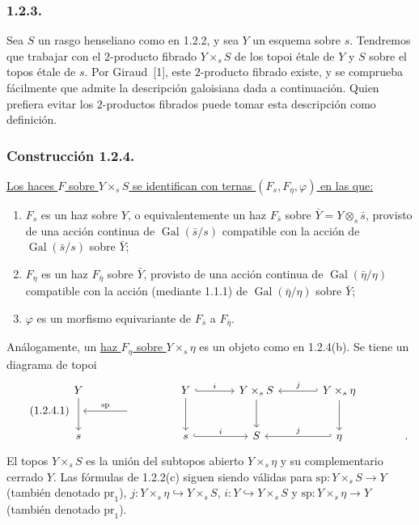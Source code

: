 \subsubsection*{1.2.3.}
Sea $S$ un rasgo henseliano como en 1.2.2, y sea $Y$ un esquema sobre $s$.
Tendremos que trabajar con el $2$-producto fibrado $Y\times_sS$ de los topoi
étale de $Y$ y $S$ sobre el topos étale de $s$. Por Giraud~[1], este
$2$-producto fibrado existe, y se comprueba fácilmente que admite la
descripción galoisiana dada a continuación. Quien prefiera evitar los
$2$-productos fibrados puede tomar esta descripción como definición.

\pageoriginale

\subsubsection*{Construcción 1.2.4.}
\underline{Los haces $F$ sobre $Y\times_sS$ se identifican con ternas
$(F_s,F_\eta,\varphi)$ en las que:}
\begin{enumerate}[label=(\alph*)]
\item $F_s$ es un haz sobre $Y$, o equivalentemente un haz $F_{\bar s}$
sobre $\bar Y=Y\otimes_s\bar s$, provisto de una acción continua de
$\operatorname{Gal}(\bar s/s)$ compatible con la acción de
$\operatorname{Gal}(\bar s/s)$ sobre $\bar Y$;

\item $F_\eta$ es un haz $F_{\bar\eta}$ sobre $\bar Y$, provisto de una
acción continua de $\operatorname{Gal}(\bar\eta/\eta)$ compatible con la
acción (mediante 1.1.1) de $\operatorname{Gal}(\bar\eta/\eta)$ sobre $\bar Y$;

\item $\varphi$ es un morfismo equivariante de $F_{\bar s}$ a
$F_{\bar\eta}$.
\end{enumerate}
Análogamente, un \underline{haz $F_\eta$ sobre $Y\times_s\eta$} es un objeto
como en 1.2.4(b). Se tiene un diagrama de topoi
\begin{equation}\tag{1.2.4.1}
\begin{tikzcd}[column sep=large, row sep=small]
Y \arrow[dd] & {} & Y \arrow[r, hook, "i"] \arrow[dd]
  & Y\times_sS \arrow[dd]
  & Y\times_s\eta \arrow[l, hook', "j"'] \arrow[dd] & {} \\
{} & {} \arrow[l, "\mathrm{sp}"'] & {} & {} & {} & {} \\
s & {} & s \arrow[r, hook, "i"] & S
  & \eta \arrow[l, hook', "j"'] & {.}
\end{tikzcd}
\end{equation}
El topos $Y\times_sS$ es la unión del subtopos abierto $Y\times_s\eta$ y su
complementario cerrado $Y$. Las fórmulas de 1.2.2(c) siguen siendo válidas
para $\mathrm{sp}:Y\times_sS\longrightarrow Y$ (también denotado
$\mathrm{pr}_1$), $j:Y\times_s\eta\hookrightarrow Y\times_sS$,
$i:Y\hookrightarrow Y\times_sS$ y
$\mathrm{sp}:Y\times_s\eta\longrightarrow Y$ (también denotado
$\mathrm{pr}_1$).

